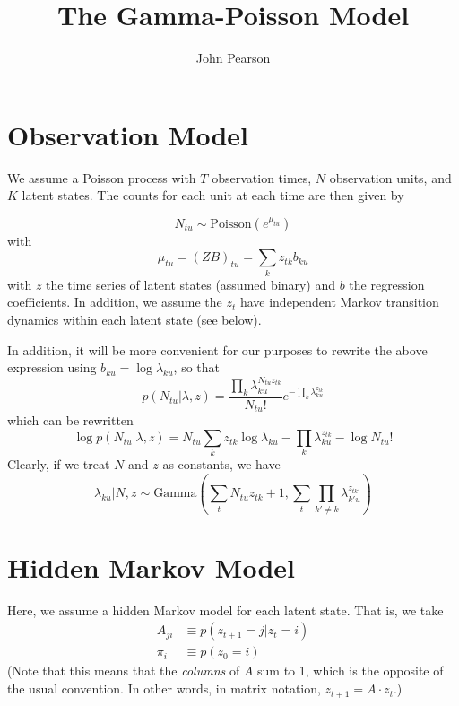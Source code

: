 \documentclass[11pt]{article}
\begin{document}
\title{The Gamma-Poisson Model}
\author{John Pearson}
\maketitle

\section{Observation Model}
We assume a Poisson process with $T$ observation times, $N$ observation units, and $K$ latent states. The counts for each unit at each time are then given by

\begin{equation}
    N_{tu} \sim \mathrm{Poisson}(e^{\mu_{tu}})
\end{equation}
with
\begin{equation}
   \mu_{tu} = (ZB)_{tu} = \sum_k z_{tk} b_{ku}
\end{equation}
with $z$ the time series of latent states (assumed binary) and $b$ the regression coefficients. In addition, we assume the $z_t$ have independent Markov transition dynamics within each latent state (see below).

In addition, it will be more convenient for our purposes to rewrite the above expression using $b_{ku} = \log \lambda_{ku}$, so that
\begin{equation}
    p(N_{tu}|\lambda, z) = \frac{\prod_k \lambda_{ku}^{N_{tu} z_{tk}}}{N_{tu}!} e^{-\prod_k \lambda_{ku}^{z_{tk}}}
\end{equation}
which can be rewritten
\begin{equation}
    \log p(N_{tu}|\lambda, z) = N_{tu} \sum_k z_{tk} \log \lambda_{ku} - \prod_k \lambda_{ku}^{z_{tk}} - \log N_{tu}!
\end{equation}
Clearly, if we treat $N$ and $z$ as constants, we have
\begin{equation}
    \lambda_{ku}|N, z \sim \mathrm{Gamma}(\sum_t N_{tu}z_{tk} + 1, \sum_t\prod_{k'\neq k} \lambda_{k'u}^{z_{tk'}})
\end{equation}

\section{Hidden Markov Model}
Here, we assume a hidden Markov model for each latent state. That is, we take
\begin{align}
    A_{ji} &\equiv p(z_{t+1}=j|z_t = i) \\
    \pi_i &\equiv p(z_0 = i)
\end{align}
(Note that this means that the \emph{columns} of $A$ sum to 1, which is the opposite of the usual convention. In other words, in matrix notation, $z_{t+1} = A \cdot z_t$.)
\end{document}
